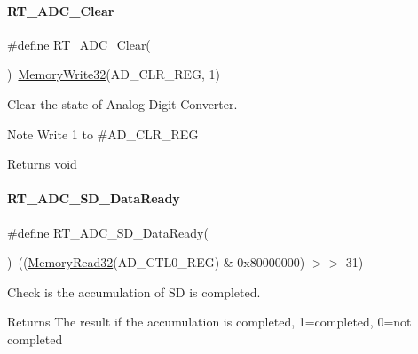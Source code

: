 \paragraph{\texorpdfstring{R\+T\+\_\+\+A\+D\+C\+\_\+\+Clear}{RT\_ADC\_Clear}}
{\footnotesize\ttfamily \#define R\+T\+\_\+\+A\+D\+C\+\_\+\+Clear(\begin{DoxyParamCaption}{ }\end{DoxyParamCaption})~\mbox{\hyperlink{a00020_a6b9732365b12e48ddb89fe1028b975b0}{Memory\+Write32}}(A\+D\+\_\+\+C\+L\+R\+\_\+\+R\+EG, 1)}



Clear the state of Analog Digit Converter. 

\begin{DoxyNote}{Note}
Write 1 to \#\+A\+D\+\_\+\+C\+L\+R\+\_\+\+R\+EG 
\end{DoxyNote}
\begin{DoxyReturn}{Returns}
void 
\end{DoxyReturn}
\mbox{\label{a00002_aa3fc5e0f9802d24cd8c0090c86bf9299}} 
\paragraph{\texorpdfstring{R\+T\+\_\+\+A\+D\+C\+\_\+\+S\+D\+\_\+\+Data\+Ready}{RT\_ADC\_SD\_DataReady}}
{\footnotesize\ttfamily \#define R\+T\+\_\+\+A\+D\+C\+\_\+\+S\+D\+\_\+\+Data\+Ready(\begin{DoxyParamCaption}{ }\end{DoxyParamCaption})~((\mbox{\hyperlink{a00020_a2d484dc15bdf30ee11ab3b05f31f0e16}{Memory\+Read32}}(A\+D\+\_\+\+C\+T\+L0\+\_\+\+R\+EG) \& 0x80000000) $>$$>$ 31)}



Check is the accumulation of SD is completed. 

\begin{DoxyReturn}{Returns}
The result if the accumulation is completed, 1=completed, 0=not completed 
\end{DoxyReturn}
\mbox{\label{a00002_ac57cb41fced89567b192b3a26bb0cb91}} 
